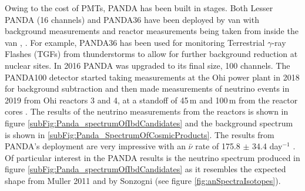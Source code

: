 Owing to the cost of PMTs, PANDA has been built in stages.  Both Lesser PANDA (16 channels) and PANDA36 have been deployed by van with background measurements and reactor measurements being taken from inside the van \cite{PANDA_2012}, \cite{PANDA_2014}. For example, PANDA36 has been used for monitoring Terrestrial $\gamma$-ray Flashes (TGFs) from thunderstorms to allow for further background reduction at nuclear sites\cite{PANDA_tgf}. In 2016 PANDA was upgraded to its final size, 100 channels. The PANDA100 detector started taking measurements at the Ohi power plant in 2018 for background subtraction and then made measurements of neutrino events in 2019 from Ohi reactors 3 and 4, at a standoff of 45\,m and 100\,m from the reactor cores \cite{Iwata_2019}. The results of the neutrino measurements from the reactors is shown in figure \ref{subFig:Panda_spectrumOfIbdCandidates} and the background spectrum is shown in \ref{subFig:Panda_SpectrumOfCosmicProducts}. The results from PANDA's deployment are very impressive with an $\bar{\nu}$ rate of 175.8 $\pm$ 34.4 day$^{-1}$ \cite{IIRIE_Panda_2021}. Of particular interest in the PANDA results is the neutrino spectrum produced in figure \ref{subFig:Panda_spectrumOfIbdCandidates} as it resembles the expected shape from Muller 2011 \cite{Mueller_2011} and by Sonzogni \cite{sonzogni_nucStrcutre_2015} (see figure \ref{fig:anSpectraIsotopes}).

